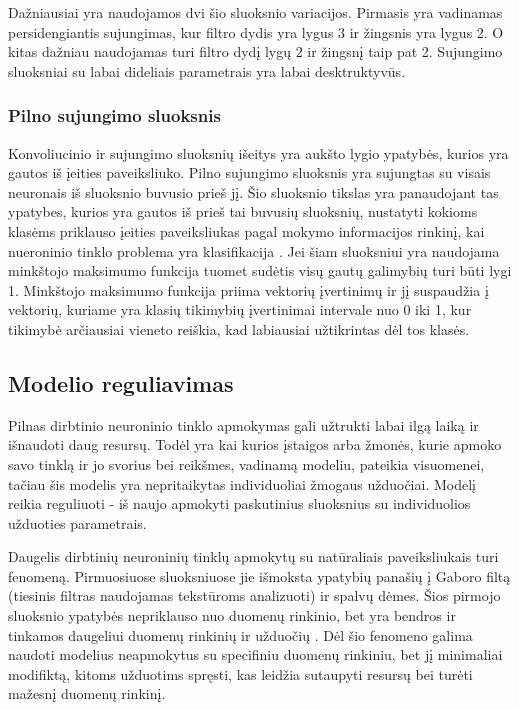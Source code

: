 \documentclass{VUMIFPSkursinis}
\begin{document}
Dažniausiai yra naudojamos dvi šio sluoksnio variacijos. Pirmasis yra vadinamas persidengiantis sujungimas, kur filtro dydis yra lygus 3 ir žingsnis yra lygus 2. 
O kitas dažniau naudojamas turi filtro dydį lygų 2 ir žingsnį taip pat 2. Sujungimo sluoksniai su labai dideliais parametrais yra labai desktruktyvūs.

\subsubsection{Pilno sujungimo sluoksnis}
Konvoliucinio ir sujungimo sluoksnių išeitys yra aukšto lygio ypatybės, kurios yra gautos iš įeities paveiksliuko. Pilno sujungimo sluoksnis yra sujungtas su visais 
neuronais iš sluoksnio buvusio prieš jį. Šio sluoksnio tikslas yra panaudojant tas ypatybes, kurios yra gautos iš prieš tai buvusių sluoksnių, nustatyti kokioms 
klasėms priklauso įeities paveiksliukas pagal mokymo informacijos rinkinį, kai nueroninio tinklo problema yra klasifikacija \cite{layers-fullyconnected}. Jei šiam sluoksniui yra naudojama 
minkštojo maksimumo funkcija tuomet sudėtis visų gautų galimybių turi būti lygi 1. Minkštojo maksimumo funkcija priima vektorių įvertinimų ir jį suspaudžia į 
vektorių, kuriame yra klasių tikimybių įvertinimai intervale nuo 0 iki 1, kur tikimybė arčiausiai vieneto reiškia, kad labiausiai užtikrintas dėl tos klasės.

\subsection{Modelio reguliavimas}
Pilnas dirbtinio neuroninio tinklo apmokymas gali užtrukti labai ilgą laiką ir išnaudoti daug resursų. Todėl yra kai kurios įstaigos arba žmonės, kurie apmoko savo 
tinklą ir jo svorius bei reikšmes, vadinamą modeliu, pateikia visuomenei, tačiau šis modelis yra nepritaikytas individuoliai žmogaus užduočiai. Modelį reikia 
reguliuoti - iš naujo apmokyti paskutinius sluoksnius su individuolios užduoties parametrais.

Daugelis dirbtinių neuroninių tinklų apmokytų su natūraliais paveiksliukais turi fenomeną. Pirmuosiuose sluoksniuose jie išmoksta ypatybių panašių į Gaboro filtą 
(tiesinis filtras naudojamas tekstūroms analizuoti) ir spalvų dėmes. Šios pirmojo sluoksnio ypatybės nepriklauso nuo duomenų rinkinio, bet yra bendros ir tinkamos 
daugeliui duomenų rinkinių ir užduočių \cite{DBLP:journals/corr/YosinskiCBL14}. Dėl šio fenomeno galima naudoti modelius neapmokytus su specifiniu duomenų rinkiniu, 
bet jį minimaliai modifiktą, kitoms užduotims spręsti, kas leidžia sutaupyti resursų bei turėti mažesnį duomenų rinkinį.
\end{document}
